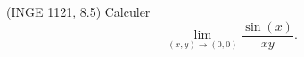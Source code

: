 

\begin{exercice}\label{exoFoncDeuxVar0014}

	(INGE 1121, 8.5) Calculer
	\begin{equation}
		\lim_{(x,y)\to(0,0)}\frac{ \sin(x) }{ xy }.
	\end{equation}

\end{exercice}

